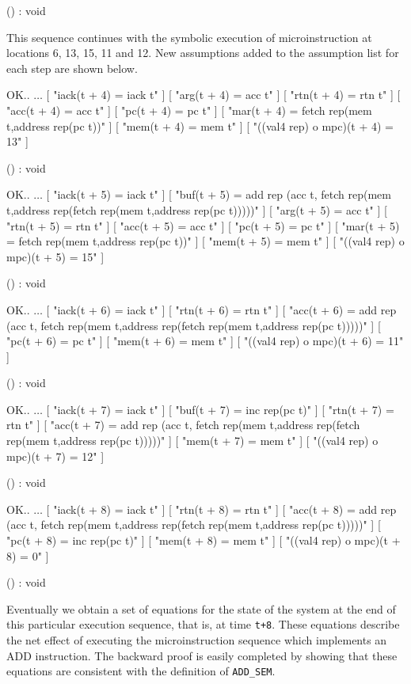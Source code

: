 () : void
\endtt

This sequence continues with the symbolic execution of
microinstruction at locations 6, 13, 15, 11 and 12.
New assumptions added to the assumption list
for each step are shown below.

\begintt
OK..
    \(\ldots\)
    [ "iack(t + 4) = iack t" ]
    [ "arg(t + 4) = acc t" ]
    [ "rtn(t + 4) = rtn t" ]
    [ "acc(t + 4) = acc t" ]
    [ "pc(t + 4) = pc t" ]
    [ "mar(t + 4) = fetch rep(mem t,address rep(pc t))" ]
    [ "mem(t + 4) = mem t" ]
    [ "((val4 rep) o mpc)(t + 4) = 13" ]

() : void
\endtt

\begintt
OK..
    \(\ldots\)
    [ "iack(t + 5) = iack t" ]
    [ "buf(t + 5) =
       add 
       rep
       (acc t,
        fetch rep(mem t,address rep(fetch rep(mem t,address rep(pc t)))))" ]
    [ "arg(t + 5) = acc t" ]
    [ "rtn(t + 5) = rtn t" ]
    [ "acc(t + 5) = acc t" ]
    [ "pc(t + 5) = pc t" ]
    [ "mar(t + 5) = fetch rep(mem t,address rep(pc t))" ]
    [ "mem(t + 5) = mem t" ]
    [ "((val4 rep) o mpc)(t + 5) = 15" ]

() : void
\endtt

\begintt
OK..
    \(\ldots\)
    [ "iack(t + 6) = iack t" ]
    [ "rtn(t + 6) = rtn t" ]
    [ "acc(t + 6) =
       add 
       rep
       (acc t,
        fetch rep(mem t,address rep(fetch rep(mem t,address rep(pc t)))))" ]
    [ "pc(t + 6) = pc t" ]
    [ "mem(t + 6) = mem t" ]
    [ "((val4 rep) o mpc)(t + 6) = 11" ]

() : void
\endtt

\begintt
OK..
    \(\ldots\)
    [ "iack(t + 7) = iack t" ]
    [ "buf(t + 7) = inc rep(pc t)" ]
    [ "rtn(t + 7) = rtn t" ]
    [ "acc(t + 7) =
       add 
       rep
       (acc t,
        fetch rep(mem t,address rep(fetch rep(mem t,address rep(pc t)))))" ]
    [ "mem(t + 7) = mem t" ]
    [ "((val4 rep) o mpc)(t + 7) = 12" ]

() : void
\endtt

\begintt
OK..
    \(\ldots\)
    [ "iack(t + 8) = iack t" ]
    [ "rtn(t + 8) = rtn t" ]
    [ "acc(t + 8) =
       add 
       rep
       (acc t,
        fetch rep(mem t,address rep(fetch rep(mem t,address rep(pc t)))))" ]
    [ "pc(t + 8) = inc rep(pc t)" ]
    [ "mem(t + 8) = mem t" ]
    [ "((val4 rep) o mpc)(t + 8) = 0" ]

() : void
\endtt

Eventually we obtain
a set of equations for the state of the system at the
end of this particular execution sequence,
that is, at time \verb"t+8".
These equations describe the net effect of executing
the microinstruction sequence which implements an ADD instruction.
The backward proof is easily completed by showing that these
equations are consistent with the definition of \verb"ADD_SEM".


